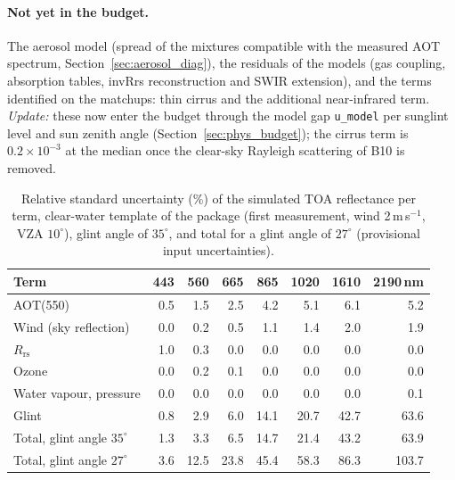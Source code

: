 \documentclass[11pt,a4paper]{article}
\newcommand{\Rrs}{R_\mathrm{rs}}
\newcommand{\code}[1]{\texttt{#1}}
\begin{document}
\paragraph{Not yet in the budget.} The aerosol model (spread of the mixtures compatible with the measured AOT
spectrum, Section~\ref{sec:aerosol_diag}), the residuals of the models (gas coupling, absorption tables, invRrs
reconstruction and SWIR extension), and the terms identified on the matchups: thin cirrus and the additional
near-infrared term. \textit{Update:} these now enter the budget through the model gap \code{u\_model} per sunglint
level and sun zenith angle (Section~\ref{sec:phys_budget}); the cirrus term is $0.2\times10^{-3}$ at the median once
the clear-sky Rayleigh scattering of B10 is removed.

\begin{table}[h]
\centering\small
\caption{Relative standard uncertainty (\%) of the simulated TOA reflectance per term, clear-water template of the
package (first measurement, wind 2\,m\,s$^{-1}$, VZA $10^\circ$), glint angle of $35^\circ$, and total for a glint angle of
$27^\circ$ (provisional input uncertainties).}
\label{tab:budget}
\begin{tabular}{lrrrrrrr}
\toprule
Term & 443 & 560 & 665 & 865 & 1020 & 1610 & 2190\,nm \\
\midrule
AOT(550)                    & 0.5 & 1.5 & 2.5 & 4.2 & 5.1 & 6.1 & 5.2 \\
Wind (sky reflection)       & 0.0 & 0.2 & 0.5 & 1.1 & 1.4 & 2.0 & 1.9 \\
$\Rrs$                      & 1.0 & 0.3 & 0.0 & 0.0 & 0.0 & 0.0 & 0.0 \\
Ozone                       & 0.0 & 0.2 & 0.1 & 0.0 & 0.0 & 0.0 & 0.0 \\
Water vapour, pressure      & 0.0 & 0.0 & 0.0 & 0.0 & 0.0 & 0.0 & 0.1 \\
Glint                       & 0.8 & 2.9 & 6.0 & 14.1 & 20.7 & 42.7 & 63.6 \\
\midrule
Total, glint angle $35^\circ$ & 1.3 & 3.3 & 6.5 & 14.7 & 21.4 & 43.2 & 63.9 \\
Total, glint angle $27^\circ$ & 3.6 & 12.5 & 23.8 & 45.4 & 58.3 & 86.3 & 103.7 \\
\bottomrule
\end{tabular}
\end{table}
\end{document}
